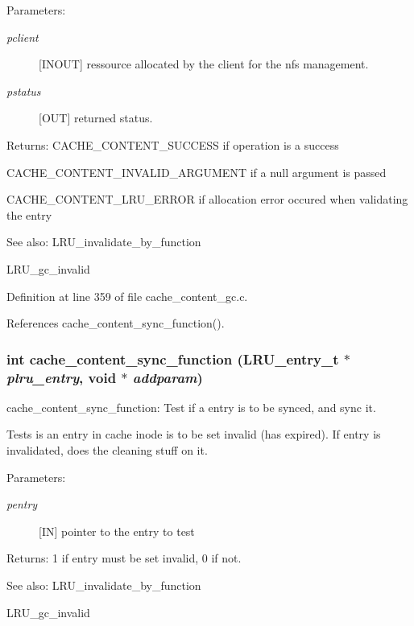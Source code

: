 \begin{Desc}
\item[Parameters:]
\begin{description}
\item[{\em pclient}][INOUT] ressource allocated by the client for the nfs management. \item[{\em pstatus}][OUT] returned status.\end{description}
\end{Desc}
\begin{Desc}
\item[Returns:]CACHE\_\-CONTENT\_\-SUCCESS if operation is a success \par
 

CACHE\_\-CONTENT\_\-INVALID\_\-ARGUMENT if a null argument is passed \par
 

CACHE\_\-CONTENT\_\-LRU\_\-ERROR if allocation error occured when validating the entry\end{Desc}
\begin{Desc}
\item[See also:]LRU\_\-invalidate\_\-by\_\-function 

LRU\_\-gc\_\-invalid \end{Desc}


Definition at line 359 of file cache\_\-content\_\-gc.c.

References cache\_\-content\_\-sync\_\-function().
\subsubsection{\setlength{\rightskip}{0pt plus 5cm}int cache\_\-content\_\-sync\_\-function (LRU\_\-entry\_\-t $\ast$ {\em plru\_\-entry}, void $\ast$ {\em addparam})}\label{cache__content__gc_8c_a6}


cache\_\-content\_\-sync\_\-function: Test if a entry is to be synced, and sync it.

Tests is an entry in cache inode is to be set invalid (has expired). If entry is invalidated, does the cleaning stuff on it.

\begin{Desc}
\item[Parameters:]
\begin{description}
\item[{\em pentry}][IN] pointer to the entry to test\end{description}
\end{Desc}
\begin{Desc}
\item[Returns:]1 if entry must be set invalid, 0 if not.\end{Desc}
\begin{Desc}
\item[See also:]LRU\_\-invalidate\_\-by\_\-function 

LRU\_\-gc\_\-invalid \end{Desc}


